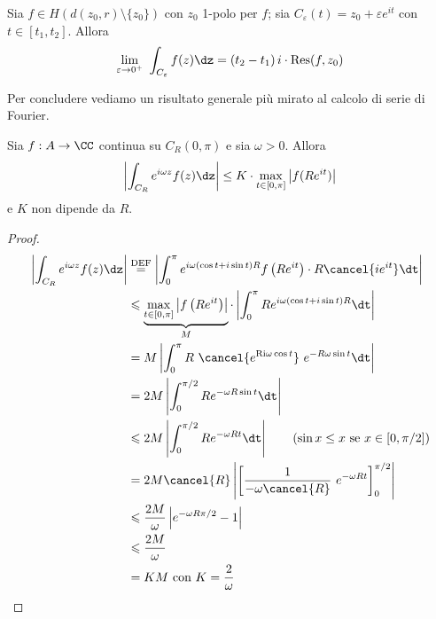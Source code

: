 \begin{coro}
Sia $f\in H(d(z_0,r)\setminus\{z_0\})$ con $z_0$ 1-polo per $f$; sia $C_{\varepsilon}(t)=z_0+\varepsilon e^{it}$ con $t\in[t_1,t_2]$. Allora
\begin{equation*}
\lim_{\varepsilon\rightarrow 0^+}\ \int_{C_{\varepsilon}} f(z)\dz = (t_2-t_1)\,i\cdot\Res(f,z_0) 
\end{equation*}
\end{coro}

Per concludere vediamo un risultato generale più mirato al calcolo di serie di Fourier.

\begin{lemma}[di Jordan]
Sia $f:A\to\CC$ continua su $C_R(0,\pi)$ e sia $\omega>0$. Allora
\begin{equation*}
\left| \int_{C_R} e^{i\omega z}f(z)\dz \right| \leq K\cdot \max_{t\in[0,\pi]}\left|f(Re^{it})\right|
\end{equation*}
e $K$ non dipende da $R$.
\end{lemma}


\begin{proof}\leavevmode
\begin{equation*}
\begin{aligned}
\left|\int_{C_R} e^{i \omega z} f(z) \dz\right| &\stackrel{\mathrm{DEF}}{=}\left|\int_0^\pi e^{i \omega(\cos t+i \sin t) R} f\left(R e^{i t}\right) \cdot R \cancel{i e^{i t}} \dt\right|\\
&\leqslant \underbrace{\max _{t \in[0, \pi]}\left|f\left(R e^{i t}\right)\right|}_M\cdot\left|\int_0^\pi Re^{i \omega(\cos t+i \sin t) R} \dt\right|\\
&=M\left|\int_0^\pi R\ \cancel{e^{\text {Ri}\omega \cos t}}\ e^{-R \omega \sin t} \dt\right|\\
&=2 M\left|\int_0^{\pi / 2} R e^{-\omega R \sin t} \dt\right|\\
&\leqslant 2 M\left|\int_0^{\pi / 2} R e^{-\omega R t} \dt\right| \qquad \left(\sin x\leq x\text{ se } x\in[0,\pi/2]\right)\\
&=2 M \cancel{R}\left|\left[\frac{1}{-\omega \cancel{R}}\ e^{-\omega R t}\right]_0^{\pi / 2}\right|\\
&\leqslant \frac{2 M}{\omega}\left|e^{-\omega R \pi / 2}-1\right|\\
&\leqslant \frac{2 M}{\omega}\\
&=K M \text { con } K=\frac{2}{\omega}
\end{aligned}
\end{equation*}
\end{proof}

